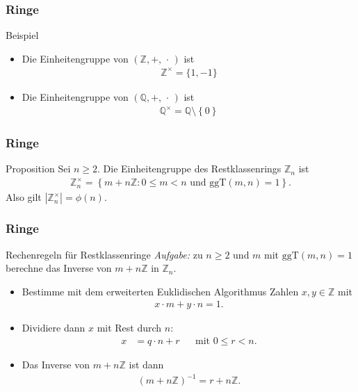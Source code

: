 \documentclass{beamer}
\renewcommand{\emph}[1]{{\textcolor{solarizedRed}{\itshape #1}}}
\newcommand\ZZ{\mathbb Z}
\newcommand\QQ{\mathbb Q}
\newcommand\cbc[1]{\left\{{#1}\right\}}
\newcommand{\ggt}{\mathrm{ggT}}
\newcommand{\ue}{\"u}
\begin{document}
\begin{frame}\frametitle{Ringe}
	\begin{block}{Beispiel}
		\begin{itemize}
			\item Die Einheitengruppe von $(\ZZ,+,\,\cdot\,)$ ist
				\begin{align*}
					\ZZ^\times=\{1,-1\}
				\end{align*}
			\item Die Einheitengruppe von $(\QQ,+,\,\cdot\,)$ ist
				\begin{align*}
					\QQ^\times=\QQ\setminus\cbc 0
				\end{align*}
		\end{itemize}
	\end{block}
\end{frame}

\begin{frame}\frametitle{Ringe}
	\begin{block}{Proposition}
		Sei $n\geq2$.
		Die Einheitengruppe des Restklassenrings $\ZZ_n$ ist
		\begin{align*}
			\ZZ_n^\times=\cbc{m+n\ZZ:0\leq m<n\mbox{ und }\ggt(m,n)=1}.
		\end{align*}
		Also gilt $|\ZZ_n^\times|=\phi(n)$.
	\end{block}
\end{frame}

\begin{frame}\frametitle{Ringe}
	\begin{block}{Rechenregeln f\ue r Restklassenringe}
		\emph{Aufgabe:} zu $n\geq2$ und $m$ mit $\ggt(m,n)=1$ berechne das Inverse von $m+n\ZZ$ in $\ZZ_n$.
		\begin{itemize}
			\item Bestimme mit dem erweiterten Euklidischen Algorithmus Zahlen $x,y\in\ZZ$ mit
				\begin{align*}
					x\cdot m+y\cdot n=1.
				\end{align*}
			\item Dividiere dann $x$ mit Rest durch $n$:
				\begin{align*}
					x&=q\cdot n+r&&\mbox{mit }0\leq r<n.
				\end{align*}
			\item Das Inverse von $m+n\ZZ$ ist dann
				\begin{align*}
					(m+n\ZZ)^{-1}=r+n\ZZ.
				\end{align*}
		\end{itemize}
	\end{block}
\end{frame}
\end{document}
